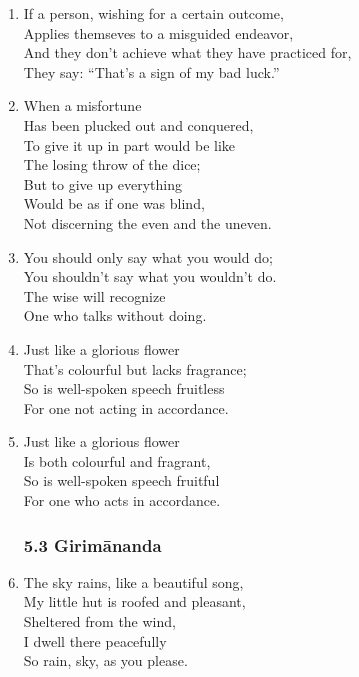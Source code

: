 \documentclass[10pt, openany]{book}
\begin{document}
\begin{enumerate}
\item If a person, wishing for a certain outcome,\\
Applies themseves to a misguided endeavor,\\
And they don’t achieve what they have practiced for,\\
They say: “That’s a sign of my bad luck.”

\item When a misfortune \\
Has been plucked out and conquered,\\
To give it up in part would be like \\
The losing throw of the dice;\\
But to give up everything \\
Would be as if one was blind,\\
Not discerning the even and the uneven.

\item You should only say what you would do;\\
You shouldn’t say what you wouldn’t do.\\
The wise will recognize\\
One who talks without doing.

\item Just like a glorious flower\\
That’s colourful but lacks fragrance;\\
So is well-spoken speech fruitless\\
For one not acting in accordance.

\item Just like a glorious flower\\
Is both colourful and fragrant,\\
So is well-spoken speech fruitful\\
For one who acts in accordance.

\subsubsection*{5.3 Girimānanda}

\item The sky rains, like a beautiful song,\\
My little hut is roofed and pleasant, \\
Sheltered from the wind,\\
I dwell there peacefully\\
So rain, sky, as you please.


\end{enumerate}
\end{document}
